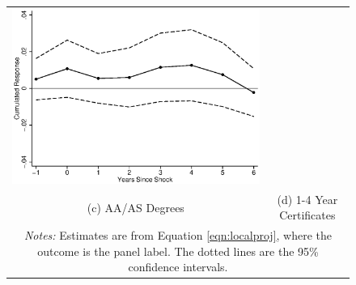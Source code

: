 \begin{figure}[h]
\begin{tabular}{cc}
\includegraphics[scale=0.6]{./figures/cumresp_cz_aw_1t447}\\
(c) AA/AS Degrees&(d) 1-4 Year Certificates\\
\multicolumn{2}{p{6in}}{\footnotesize \emph{Notes:} Estimates are from Equation \ref{eqn:localproj}, where the outcome is the panel label. The dotted lines are the 95\% confidence intervals.}
\end{tabular}
\label{fig:czlproj}
\end{figure}



\clearpage
\begin{table}[h]\centering\caption{Summary Statistics, 2006-2013}
\def\sym#1{\ifmmode^{#1}\else\(^{#1}\)\fi}
\label{tab:sumstats}
\end{table}







